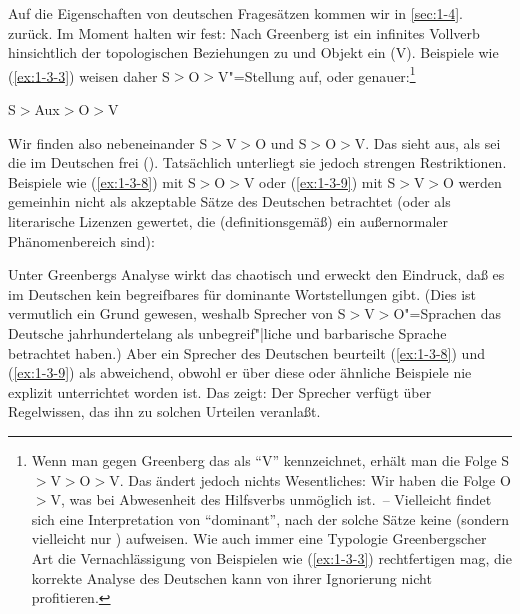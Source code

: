 \documentclass[output=paper]{langsci/langscibook}
\begin{document}
Auf die Eigenschaften von deutschen Fragesätzen kommen wir in
\ref{sec:1-4}. zurück. Im Moment halten wir fest: Nach Greenberg ist
ein infinites Vollverb hinsichtlich der topologischen Beziehungen zu
 und Objekt ein  (V). Beispiele wie (\ref{ex:1-3-3})
weisen daher S$>$O$>$V"=Stellung auf, oder genauer:\footnote{%
  Wenn man
  gegen Greenberg das  als "`V"' kennzeichnet, erhält man die
  Folge S$>$V$>$O$>$V. Das ändert jedoch nichts Wesentliches: Wir
  haben die Folge O$>$V, was bei Abwesenheit des Hilfsverbs unmöglich
  ist.~-- Vielleicht findet sich eine Interpretation von "`dominant"',
  nach der solche Sätze keine  (sondern vielleicht nur
  )  aufweisen. Wie auch immer eine Typologie
  Greenbergscher Art die Vernachlässigung von Beispielen wie
  (\ref{ex:1-3-3}) rechtfertigen mag, die korrekte Analyse des
  Deutschen kann von ihrer Ignorierung nicht profitieren.%
}
\begin{exe}
\ex\label{ex:1-3-7}
S$>$Aux$>$O$>$V
\end{exe}
Wir finden also nebeneinander S$>$V$>$O und S$>$O$>$V. Das sieht aus, als sei die  im Deutschen frei (). Tatsächlich unterliegt sie jedoch strengen Restriktionen. Beispiele wie (\ref{ex:1-3-8}) mit S$>$O$>$V oder (\ref{ex:1-3-9}) mit S$>$V$>$O werden gemeinhin
nicht als akzeptable Sätze des Deutschen betrachtet (oder als literarische Lizenzen
gewertet, die (definitionsgemäß) ein außernormaler Phänomenbereich sind):
\begin{exe}
\ex\label{ex:1-3-8}
\begin{xlist}
\end{xlist}
\end{exe}
\begin{exe}
\ex\label{ex:1-3-9}
\begin{xlist}
\end{xlist}
\end{exe}
Unter Greenbergs Analyse wirkt das chaotisch und erweckt den Eindruck, daß es im
Deutschen kein begreifbares  für dominante Wortstellungen gibt. (Dies ist
vermutlich ein Grund gewesen, weshalb Sprecher von S$>$V$>$O"=Sprachen das Deutsche jahrhundertelang als unbegreif"|liche und barbarische Sprache betrachtet haben.)
Aber ein Sprecher des Deutschen beurteilt (\ref{ex:1-3-8}) und (\ref{ex:1-3-9}) als abweichend, obwohl er
über diese oder ähnliche Beispiele nie explizit unterrichtet worden ist. Das zeigt: Der
Sprecher verfügt über Regelwissen, das ihn zu solchen Urteilen veranlaßt.
\end{document}
